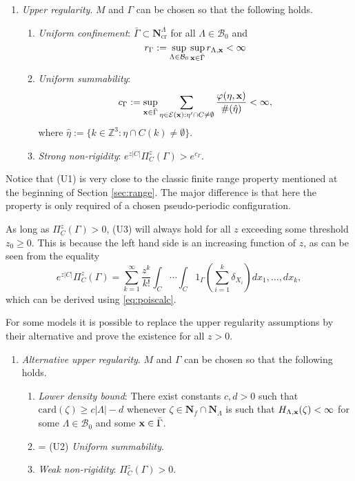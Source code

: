 \begin{enumerate}[\textbf{(U)}] 
	\item \textit{Upper regularity}. $M$ and $\Gamma$ can be chosen so that the following holds. 
		\begin{enumerate}[(U1)]
			\item \textit{Uniform confinement}: $\bar \Gamma \subset \mathbf N^\Lambda_\text{cr}$ for all $\Lambda \in \mathcal B_0$ and 
			\begin{equation}\label{eq:U1}r_\Gamma := \sup_{\Lambda\in\mathcal B_0}\sup_{{\mathbf{x}} \in \bar\Gamma} r_{\Lambda, {\mathbf{x}}} < \infty\end{equation}
			\item \textit{Uniform summability}: 
			$$c_\Gamma := \sup_{{\mathbf{x}} \in \bar\Gamma}  \sum_{\eta \in \mathcal E({\mathbf{x}}): \eta' \cap C \neq \emptyset} \frac{\varphi(\eta,{\mathbf{x}})}{\#(\hat\eta)} < \infty,$$
where $\hat\eta := \{k \in \mathbb Z^3: \eta \cap C(k) \neq \emptyset\}$.
\item \textit{Strong non-rigidity}: $e^{z|C|} \Pi^z_C(\Gamma) > e^{c_\Gamma}$.
		\end{enumerate}
\end{enumerate}

Notice that (U1) is very close to the classic finite range property mentioned at the beginning of Section \ref{sec:range}. The major difference is that here the property is only required of a chosen pseudo-periodic configuration.


As long as $\Pi^z_C (\Gamma) >0$, (U3) will always hold for all $z$ exceeding some threshold $z_0 \geq 0$. This is because the left hand side is an increasing function of $z$, as can be seen from the equality 
$$e^{z|C|} \Pi^z_C(\Gamma) = \sum^\infty_{k=1} \frac{z^k}{k!} \int_C \cdots \int_C 1_{\Gamma} \left(\sum^k_{i=1} \delta_{X_i}\right) dx_1, \dots, dx_k,$$
which can be derived using \eqref{eq:poiscalc}. 



For some models it is possible to replace the upper regularity assumptions by their alternative and prove the existence for all $z>0$.

\begin{enumerate}[(\textbf{\^{U}})]
	\item \textit{Alternative upper regularity}. $M$ and $\Gamma$ can be chosen so that the following holds.
	\begin{enumerate}[(\^U1)]
		\item \textit{Lower density bound}: There exist constants $c,d > 0$ such that $\mathrm{card}(\zeta) \geq c|\Lambda| - d$ whenever $\zeta \in \mathbf N_f\cap\mathbf  N_\Lambda$ is such that $H_{\Lambda,{\mathbf{x}}}(\zeta)<\infty$ for some $\Lambda \in \mathcal B_0$ and some ${\mathbf{x}} \in \bar\Gamma$.
		\item = (U2) \textit{Uniform summability}.
		\item \textit{Weak non-rigidity}: $\Pi^z_C(\Gamma) > 0$.
	\end{enumerate}
\end{enumerate}






